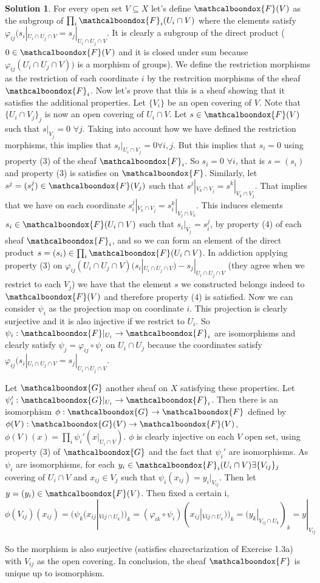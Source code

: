 \documentclass[12pt]{article}
\theoremstyle{definition}
\newtheorem*{sol}{Solution}
\newcommand{\sF}{\ensuremath{\mathcalboondox{F}}}
\newcommand{\sG}{\ensuremath{\mathcalboondox{G}}}
\begin{document}
\begin{sol}
	For every open set $V \subseteq X$ let's define $\sF(V)$ as the subgroup of $\prod_{i} \sF_i(U_i \cap V)$ where the elements satisfy $\varphi_{ij}(s_i|_{U_i \cap U_j \cap V} = s_j|_{U_i \cap U_j \cap V}$. It is clearly a subgroup of the direct product ($0 \in \sF(V)$ and it is closed under sum because $\varphi_{ij}(U_i \cap U_j \cap V))$ is a morphism of groups). We define the restriction morphisms as the restriction of each coordinate $i$ by the restrcition morphisms of the sheaf $\sF_i$. Now let's prove that this is a sheaf showing that it satisfies the additional properties. Let $\{V_i\}$ be an open covering of $V$. Note that $\{U_i \cap V_j\}_j$ is now an open covering of $U_i \cap V$. Let $s \in \sF(V)$ such that $s|_{V_j} = 0 \, \, \forall j$. Taking into account how we have defined the restriction morphisms, this implies that $s_i|_{U_i \cap V_j} = 0 \forall i,j$. But this implies that $s_i = 0$ using property (3) of the sheaf $\sF_i$. So $s_i = 0 \, \, \forall i$, that is $s = (s_i)$ and property (3) is satisfies on $\sF$. Similarly, let $s^j = (s_i^j) \in \sF(V_j)$ such that $s^j|_{V_k \cap V_j} = s^k|_{V_k \cap V_j}$. That implies that we have on each coordinate $s^j_i|_{V_k \cap V_j} = s^k_i|_{V_j \cap V_k}$. This induces elements $s_i \in \sF(U_i \cap V)$ such that $s_i|_{V_j} = s_i^j$, by property (4) of each sheaf $\sF_i$, and so we can form an element of the direct product $s = (s_i) \in \prod_{i} \sF(U_i \cap V)$. In addiction applying property (3) on $\varphi_{ij}(U_i \cap U_j \cap V)(s_i|_{U_i \cap U_j \cap V}) - s_j|_{U_i \cap U_j \cap V}$ (they agree when we restrict to each $V_j$) we have that the element $s$ we constructed belongs indeed to $\sF(V)$ and therefore property (4) is satisfied. Now we can consider $\psi_i$ as the projection map on coordinate $i$. This projection is clearly surjective and it is also injective if we restrict to $U_i$. So $\psi_i: \sF|_{U_i} \to \sF_i$ are isomorphisms and clearly satisfy $\psi_j = \varphi_{ij} \circ \psi_i$ on $U_i \cap U_j$ because the coordinates satisfy $\varphi_{ij}(s_i|_{U_i \cap U_j \cap V} = s_j|_{U_i \cap U_j \cap V}$.

	Let $\sG$ another sheaf on $X$ satisfying these properties. Let $\psi_i': \sG|_{U_i} \to \sF_i$. Then there is an isomorphism $\phi: \sG \to \sF$ defined by $\phi(V): \sG(V) \to \sF(V)$, $\phi(V)(x) = \prod_i \psi_i'(x|_{U_i \cap V})$. $\phi$ is clearly injective on each $V$ open set, using property (3) of $\sG$ and the fact that $\psi_i'$ are isomorphisms. As $\psi_i$ are isomorphisms, for each $y_i \in \sF_i(U_i \cap V) \exists \{V_{ij}\}_j$ covering of $U_i \cap V$ and $x_{ij} \in V_j$ such that $\psi_i(x_{ij}) = y_i|_{V_{ij}}$. Then let $y = (y_i) \in \sF(V)$. Then fixed a certain i, 
	\[
		\phi(V_{ij})(x_{ij}) = (\psi_k(x_{ij}|_{V{ij} \cap U_k}))_k = (\varphi_{ik} \circ \psi_i)(x_{ij}|_{V{ij} \cap U_k}))_k = (y_k|_{V_{ij} \cap U_k})_k = y|_{V_{ij}}
	\]

	So the morphism is also surjective (satisfies charectarization of Exercise 1.3a) with $V_{ij}$ as the open covering. In conclusion, the sheaf $\sF$ is unique up to isomorphism.
\end{sol}
\end{document}
